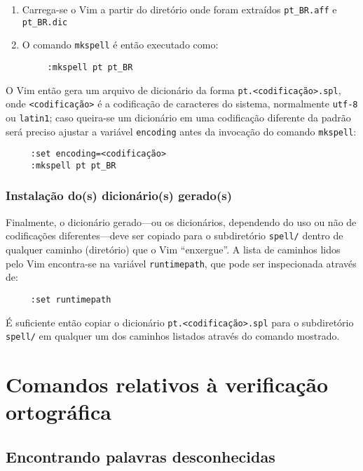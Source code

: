 \begin{enumerate}
\item Carrega-se o Vim a partir do diretório onde foram extraídos
\verb|pt_BR.aff| e \verb|pt_BR.dic|
\item O comando {\tt mkspell} é então executado como:
\begin{verbatim}
     :mkspell pt pt_BR
\end{verbatim}
\end{enumerate}

O Vim então gera um arquivo de dicionário da forma
\verb|pt.<codificação>.spl|, onde \verb|<codificação>| é a codificação de
caracteres do sistema, normalmente \verb|utf-8| ou \verb|latin1|; caso
queira-se um dicionário em uma codificação diferente da padrão será preciso
ajustar a variável {\tt encoding} antes da invocação do comando {\tt mkspell}:

\begin{verbatim}
     :set encoding=<codificação>
     :mkspell pt pt_BR
\end{verbatim}

\subsubsection{Instalação do(s) dicionário(s) gerado(s)}

Finalmente, o dicionário gerado---ou os dicionários, dependendo do uso ou não
de codificações diferentes---deve ser copiado para o subdiretório {\tt spell/}
dentro de qualquer caminho (diretório) que o Vim ``enxergue''. A lista de
caminhos lidos pelo Vim encontra-se na variável {\tt runtimepath}, que pode
ser inspecionada através de:

\begin{verbatim}
     :set runtimepath
\end{verbatim}

É suficiente então copiar o dicionário \verb|pt.<codificação>.spl| para o
subdiretório {\tt spell/} em qualquer um dos caminhos listados através do
comando mostrado. 

\section{Comandos relativos à verificação ortográfica}

\subsection{Encontrando palavras desconhecidas}

